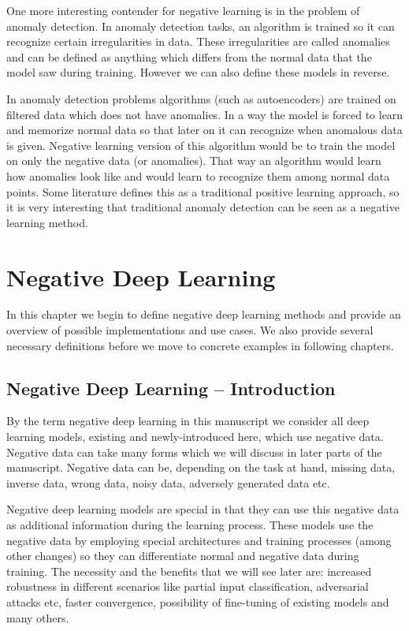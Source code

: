 \documentclass[b5paper]{book}
\begin{document}
One more interesting contender for negative learning is in the problem of anomaly detection. In anomaly detection tasks, an algorithm is trained so it can recognize certain irregularities in data. These irregularities are called anomalies and can be defined as anything which differs from the normal data that the model saw during training. However we can also define these models in reverse. 

In anomaly detection problems algorithms (such as autoencoders) are trained on filtered data which does not have anomalies. In a way the model is forced to learn and memorize normal data so that later on it can recognize when anomalous data is given. Negative learning version of this algorithm would be to train the model on only the negative data (or anomalies). That way an algorithm would learn how anomalies look like and would learn to recognize them among normal data points. Some literature defines this as a traditional positive learning approach, so it is very interesting that traditional anomaly detection can be seen as a negative learning method.

\chapter{Negative Deep Learning}

In this chapter we begin to define negative deep learning methods and provide an overview of possible implementations and use cases. We also provide several necessary definitions before we move to concrete examples in following chapters.

\section{Negative Deep Learning -- Introduction}

By the term negative deep learning in this manuscript we consider all deep learning models, existing and newly-introduced here, which use negative data. Negative data can take many forms which we will discuss in later parts of the manuscript. Negative data can be, depending on the task at hand, missing data, inverse data, wrong data, noisy data, adversely generated data etc.

Negative deep learning models are special in that they can use this negative data as additional information during the learning process. These models use the negative data by employing special architectures and training processes (among other changes) so they can differentiate normal and negative data during training. The necessity and the benefits that we will see later are: increased robustness in different scenarios like partial input classification, adversarial attacks etc, faster convergence, possibility of fine-tuning of existing models and many others.
\end{document}
